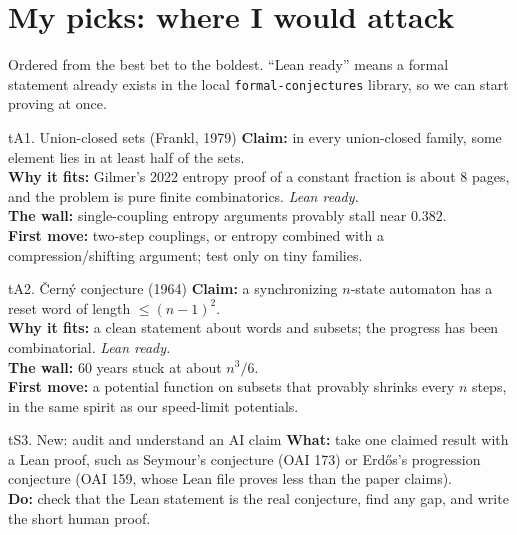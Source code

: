 \documentclass[10pt,a4paper]{article}
\begin{document}
\newpage
\section{My picks: where I would attack}\label{sec:picks}

Ordered from the best bet to the boldest. ``Lean ready'' means a formal statement already exists in the local
\texttt{formal-conjectures} library, so we can start proving at once.

\begin{tcbraster}[raster columns=2,raster equal height=rows,raster column skip=8pt,raster row skip=8pt]
\begin{card}{tA}{1. Union-closed sets (Frankl, 1979)}
\textbf{Claim:} in every union-closed family, some element lies in at least half of the sets.\\
\textbf{Why it fits:} Gilmer's 2022 entropy proof of a constant fraction is about 8 pages, and the problem is
pure finite combinatorics. \emph{Lean ready.}\\
\textbf{The wall:} single-coupling entropy arguments provably stall near $0.382$.\\
\textbf{First move:} two-step couplings, or entropy combined with a compression/shifting argument; test only on tiny families.
\end{card}
\begin{card}{tA}{2. \v{C}ern\'y conjecture (1964)}
\textbf{Claim:} a synchronizing $n$-state automaton has a reset word of length $\le(n-1)^2$.\\
\textbf{Why it fits:} a clean statement about words and subsets; the progress has been combinatorial. \emph{Lean ready.}\\
\textbf{The wall:} 60 years stuck at about $n^3/6$.\\
\textbf{First move:} a potential function on subsets that provably shrinks every $n$ steps, in the same spirit as our speed-limit potentials.
\end{card}
\begin{card}{tS}{3. New: audit and understand an AI claim}
\textbf{What:} take one claimed result with a Lean proof, such as Seymour's conjecture (OAI 173) or Erd\H{o}s's
progression conjecture (OAI 159, whose Lean file proves less than the paper claims).\\
\textbf{Do:} check that the Lean statement is the real conjecture, find any gap, and write the short human proof.\\

\end{card}
\end{tcbraster}
\end{document}
